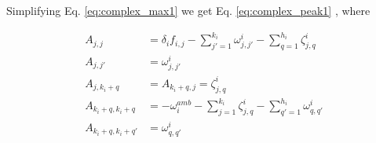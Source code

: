 \documentclass[conference]{IEEEtran}
\begin{document}
\vspace{-0.2in}

Simplifying Eq. \ref{eq:complex_max1} we get Eq. \ref{eq:complex_peak1} \cite{Fisher09}, where %

\vspace{-0.2in}


\begin{equation*}
	\begin{split}
	A_{j,j} & = \delta_i f_{i,j} - \sum_{j'=1}^{k_i} \omega^{i}_{j,j'} - \sum_{q=1}^{h_i} \zeta^{i}_{j,q} \\
	A_{j,j'} &=  \omega^{i}_{j,j'} \\
	A_{j,k_i+q} &= A_{k_i+q,j} = \zeta^{i}_{j,q} \\
	A_{k_i+q,k_i+q} &=  - \omega_i^{amb} -\sum_{j=1}^{k_i} \zeta^{i}_{j,q} - \sum_{q'=1}^{h_i} \omega^{i}_{q,q'} \\
	A_{k_i+q,k_i+q'} &= \omega^{i}_{q,q'}
	\end{split}
\end{equation*}

\vspace{-0.2in}
\end{document}
